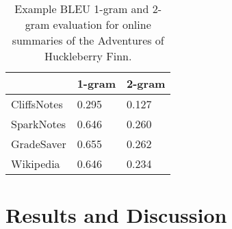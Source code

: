 \begin{table}[hbt]
	\centering
	\caption{Example BLEU 1-gram and 2-gram evaluation for online summaries of the Adventures of Huckleberry Finn.}
	\label{table:bleu_huckfinn}
	\begin{tabular}{|l|l|l|}
		\hline
		\textbf{}   & \textbf{1-gram} & \textbf{2-gram} \\ \hline
		CliffsNotes & 0.295           & 0.127           \\ \hline
		SparkNotes  & 0.646           & 0.260           \\ \hline
		GradeSaver  & 0.655           & 0.262           \\ \hline
		Wikipedia   & 0.646           & 0.234           \\ \hline
	\end{tabular}
\end{table}


\section{Results and Discussion}